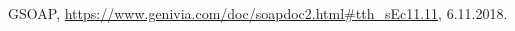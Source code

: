 \documentclass[conference]{IEEEtran}
\begin{document}







%
%
%
\begin{thebibliography}{1}


GSOAP, \url{https://www.genivia.com/doc/soapdoc2.html#tth_sEc11.11}, 6.11.2018.

\end{thebibliography}




\end{document}
